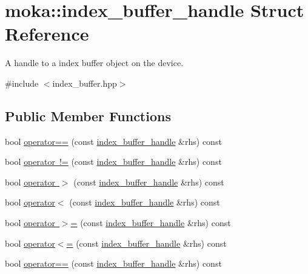 \hypertarget{structmoka_1_1index__buffer__handle}{}\section{moka\+::index\+\_\+buffer\+\_\+handle Struct Reference}
\label{structmoka_1_1index__buffer__handle}


A handle to a index buffer object on the device.  




{\ttfamily \#include $<$index\+\_\+buffer.\+hpp$>$}

\subsection*{Public Member Functions}
\begin{DoxyCompactItemize}
\item 
bool \mbox{\hyperlink{structmoka_1_1index__buffer__handle_a72330025c9b54275476c8cd789e7c262}{operator==}} (const \mbox{\hyperlink{structmoka_1_1index__buffer__handle}{index\+\_\+buffer\+\_\+handle}} \&rhs) const
\item 
bool \mbox{\hyperlink{structmoka_1_1index__buffer__handle_aa2eecc2d1f6aa0cbbfc62daeb15a801b}{operator !=}} (const \mbox{\hyperlink{structmoka_1_1index__buffer__handle}{index\+\_\+buffer\+\_\+handle}} \&rhs) const
\item 
bool \mbox{\hyperlink{structmoka_1_1index__buffer__handle_af18da67f3c77a6249f2f8e82beff9084}{operator $>$}} (const \mbox{\hyperlink{structmoka_1_1index__buffer__handle}{index\+\_\+buffer\+\_\+handle}} \&rhs) const
\item 
bool \mbox{\hyperlink{structmoka_1_1index__buffer__handle_adfebe54fd84e937125f74e2a405eb030}{operator$<$}} (const \mbox{\hyperlink{structmoka_1_1index__buffer__handle}{index\+\_\+buffer\+\_\+handle}} \&rhs) const
\item 
bool \mbox{\hyperlink{structmoka_1_1index__buffer__handle_a04ac6ce4300d17d22ff081ded3afd661}{operator $>$=}} (const \mbox{\hyperlink{structmoka_1_1index__buffer__handle}{index\+\_\+buffer\+\_\+handle}} \&rhs) const
\item 
bool \mbox{\hyperlink{structmoka_1_1index__buffer__handle_afdd908565d55f85594f71ba090a8625e}{operator$<$=}} (const \mbox{\hyperlink{structmoka_1_1index__buffer__handle}{index\+\_\+buffer\+\_\+handle}} \&rhs) const
\item 
bool \mbox{\hyperlink{structmoka_1_1index__buffer__handle_a72330025c9b54275476c8cd789e7c262}{operator==}} (const \mbox{\hyperlink{structmoka_1_1index__buffer__handle}{index\+\_\+buffer\+\_\+handle}} \&rhs) const

\end{DoxyCompactItemize}
